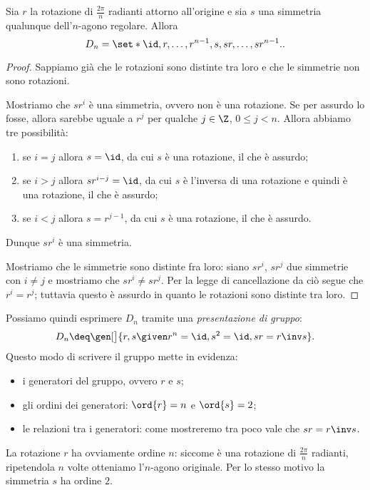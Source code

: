 \begin{proposition}{}{}
    Sia $r$ la rotazione di $\frac{2\pi}{n}$ radianti attorno all'origine e sia $s$ una simmetria qualunque dell'$n$-agono regolare. Allora \[
        D_n = \set*{\id, r, \dots, r^{n-1}, s, sr, \dots, sr^{n-1}}.    
    .\] 
\end{proposition}
\begin{proof}
    Sappiamo già che le rotazioni sono distinte tra loro e che le simmetrie non sono rotazioni. 

    Mostriamo che $sr^i$ è una simmetria, ovvero non è una rotazione. Se per assurdo lo fosse, allora sarebbe uguale a $r^j$ per qualche $j \in \Z$, $0 \leq j < n$. Allora abbiamo tre possibilità:
    \begin{enumerate}
        \item se $i = j$ allora $s = \id$, da cui $s$ è una rotazione, il che è assurdo;
        \item se $i > j$ allora $sr^{i-j} = \id$, da cui $s$ è l'inversa di una rotazione e quindi è una rotazione, il che è assurdo;
        \item se $i < j$ allora $s = r^{j-1}$, da cui $s$ è una rotazione, il che è assurdo.
    \end{enumerate}
    Dunque $sr^i$ è una simmetria.

    Mostriamo che le simmetrie sono distinte fra loro: siano $sr^i$, $s r^j$ due simmetrie con $i \neq j$ e mostriamo che $sr^i \neq sr^j$. Per la legge di cancellazione da ciò segue che $r^i = r^j$; tuttavia questo è assurdo in quanto le rotazioni sono distinte tra loro.
\end{proof}

Possiamo quindi esprimere $D_n$ tramite una \emph{presentazione di gruppo}: \[
    D_n \deq \gen[\big]{r, s \given r^n = \id, s^2 = \id, sr = r\inv s}.
\]
Questo modo di scrivere il gruppo mette in evidenza:
\begin{itemize}
    \item i generatori del gruppo, ovvero $r$ e $s$;
    \item gli ordini dei generatori: $\ord{r} = n$ e $\ord{s} = 2$;
    \item le relazioni tra i generatori: come mostreremo tra poco vale che $sr = r\inv s$.
\end{itemize}

La rotazione $r$ ha ovviamente ordine $n$: siccome è una rotazione di $\frac{2\pi}{n}$ radianti, ripetendola $n$ volte otteniamo l'$n$-agono originale.
Per lo stesso motivo la simmetria $s$ ha ordine $2$.

